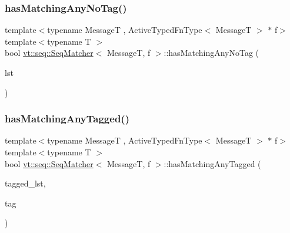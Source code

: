 \subsubsection{\texorpdfstring{has\+Matching\+Any\+No\+Tag()}{hasMatchingAnyNoTag()}}
{\footnotesize\ttfamily template$<$typename MessageT , Active\+Typed\+Fn\+Type$<$ Message\+T $>$ $\ast$ f$>$ \\
template$<$typename T $>$ \\
bool \hyperlink{structvt_1_1seq_1_1_seq_matcher}{vt\+::seq\+::\+Seq\+Matcher}$<$ MessageT, f $>$\+::has\+Matching\+Any\+No\+Tag (\begin{DoxyParamCaption}\item[{\hyperlink{structvt_1_1seq_1_1_seq_matcher_ad8e84a5a494218cd582d8467552b5ff7}{Seq\+State\+Cont\+Type}$<$ T $>$ \&}]{lst }\end{DoxyParamCaption})\hspace{0.3cm}{\ttfamily [static]}}

\mbox{\label{structvt_1_1seq_1_1_seq_matcher_a0cf869347d07625d6a5bc77e10b7e6e3}} 
\subsubsection{\texorpdfstring{has\+Matching\+Any\+Tagged()}{hasMatchingAnyTagged()}}
{\footnotesize\ttfamily template$<$typename MessageT , Active\+Typed\+Fn\+Type$<$ Message\+T $>$ $\ast$ f$>$ \\
template$<$typename T $>$ \\
bool \hyperlink{structvt_1_1seq_1_1_seq_matcher}{vt\+::seq\+::\+Seq\+Matcher}$<$ MessageT, f $>$\+::has\+Matching\+Any\+Tagged (\begin{DoxyParamCaption}\item[{\hyperlink{structvt_1_1seq_1_1_seq_matcher_aeddaef880aa6f0dcc59486374d59a4cb}{Seq\+State\+Tagged\+Cont\+Type}$<$ T $>$ \&}]{tagged\+\_\+lst,  }\item[{\hyperlink{namespacevt_a84ab281dae04a52a4b243d6bf62d0e52}{Tag\+Type} const \&}]{tag }\end{DoxyParamCaption})\hspace{0.3cm}{\ttfamily [static]}}

\mbox{\label{structvt_1_1seq_1_1_seq_matcher_aab83891cdc9b348a61bebfa481453bde}} 
